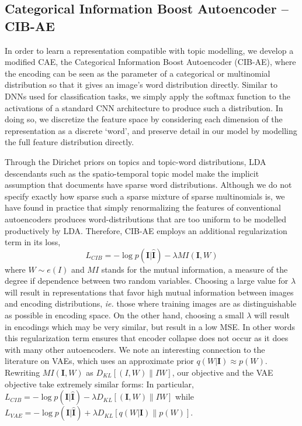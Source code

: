 \subsection{Categorical Information Boost Autoencoder -- CIB-AE}

In order to learn a representation compatible with topic modelling, we develop a modified CAE, the Categorical Information Boost Autoencoder (CIB-AE), where the encoding can be seen as the parameter of a categorical or multinomial distribution so that it gives an image's word distribution directly. Similar to DNNs used for classification tasks, we simply apply the softmax function to the activations of a standard CNN architecture to produce such a distribution. In doing so, we discretize the feature space by considering each dimension of the representation as a discrete `word', and preserve detail in our model by modelling the full feature distribution directly.

Through the Dirichet priors on topics and topic-word distributions, LDA descendants such as the spatio-temporal topic model make the implicit assumption that documents have sparse word distributions. Although we do not specify exactly how sparse such a sparse mixture of sparse multinomials is, we have found in practice that simply renormalizing the features of conventional autoencoders produces word-distributions that are too uniform to be modelled productively by LDA. Therefore, CIB-AE employs an additional regularization term in its loss,
\begin{equation}
    L_{CIB} = -\log p(\mathbf{I} | \mathbf{\hat{I}}) - \lambda MI\left(\mathbf{I}, W\right)
\end{equation}
where $W \sim e(I)$ and $MI$ stands for the mutual information, a measure of the degree if dependence between two random variables. Choosing a large value for $\lambda$ will result in representations that favor high mutual information between images and encoding distributions, \emph{ie.} those where training images are as distinguishable as possible in encoding space. On the other hand, choosing a small $\lambda$ will result in encodings which may be very similar, but result in a low MSE. In other words this regularization term ensures that encoder collapse does not occur as it does with many other autoencoders. We note an interesting connection to the literature on VAEs, which uses an approximate prior $q(W|\mathbf{I}) \approx p(W)$. Rewriting $MI\left(\mathbf{I}, W\right)$ as $D_{KL}[(I,W) \| IW ]$, our objective and the VAE objective take extremely similar forms: In particular, $L_{CIB} = -\log p(\mathbf{I} | \mathbf{\hat{I}}) - \lambda D_{KL}[(\mathbf{I},W) \| IW ]$ while $L_{VAE} = -\log p(\mathbf{I} | \mathbf{\hat{I}}) + \lambda D_{KL}[q(W|\mathbf{I}) \| p(W) ]$.

